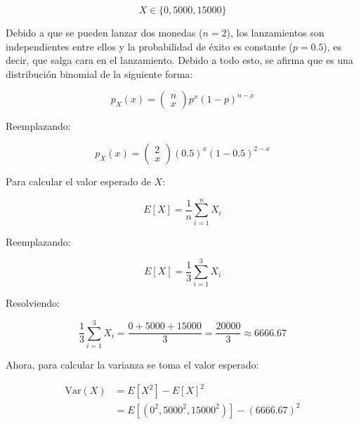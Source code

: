 \documentclass[12pt]{article}\usepackage[]{graphicx}\usepackage[]{xcolor}
\begin{document}
\[
X \in \{0, 5000, 15000 \} 
\]

Debido a que se pueden lanzar dos monedas ($n = 2$), los lanzamientos son independientes entre ellos y la probabilidad de éxito es constante ($p = 0.5$), es decir, que salga cara en el lanzamiento. Debido a todo esto, se afirma que es una distribución binomial de la siguiente forma:

\[
p_{X} (x)  =
\begin{pmatrix}
  n \\ x
\end{pmatrix} p^{x} (1 - p)^{n-x}
\]

Reemplazando:

\[
p_{X} (x)  =
\begin{pmatrix}
  2 \\ x
\end{pmatrix} (0.5)^{x} (1 - 0.5)^{2-x}
\]

Para calcular el valor esperado de $X$:

\[
E[X] = \frac{1}{n} \sum_{i = 1}^{n} X_{i}
\]

Reemplazando: 

\[
E[X] = \frac{1}{3} \sum_{i = 1}^{3} X_{i} 
\]

Resolviendo:

\[
\frac{1}{3} \sum_{i = 1}^{3} X_{i} = \frac{0 + 5000 + 15000}{3}  = \frac{20000}{3} \approx 6666.67
\]

Ahora, para calcular la varianza se toma el valor esperado:

\begin{align*}
  \mathrm{Var}(X) &= E[X^{2}] - E[X]^{2} \\
  &= E[(0^{2}, 5000^{2}, 15000^{2})] - (6666.67)^{2}
\end{align*}
\end{document}
